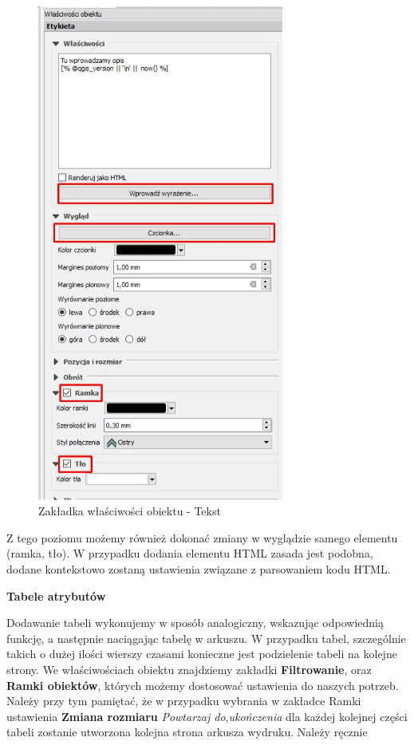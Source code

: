 \documentclass[12pt,a4paper]{book}
\begin{document}
\begin{center}
\begin{figure}
\includegraphics[width=8.096cm,height=16.369cm]{008-zakladka-tekst.png}
\caption{Zakładka właściwości obiektu - Tekst}
\end{figure}
\end{center}
Z tego poziomu możemy również dokonać zmiany w wyglądzie samego elementu (ramka, tło). W przypadku dodania elementu HTML zasada jest podobna, dodane kontekstowo zostaną ustawienia związane z parsowaniem kodu HTML.

{\bfseries
Tabele atrybutów}

Dodawanie tabeli wykonujemy w sposób analogiczny, wskazując odpowiednią funkcję, a następnie {\textquotedbl}naciągając{\textquotedbl} tabelę w arkuszu. W przypadku tabel, szczególnie takich o dużej ilości wierszy czasami konieczne jest podzielenie tabeli na kolejne strony. We właściwościach obiektu znajdziemy zakładki \textbf{Filtrowanie}, oraz \textbf{Ramki obiektów}, których możemy dostosować ustawienia do naszych potrzeb. Należy przy tym pamiętać, że w przypadku wybrania w zakładce Ramki ustawienia \textbf{Zmiana rozmiaru }\textit{Powtarzaj do},\textit{ukończenia} dla każdej kolejnej części tabeli zostanie utworzona kolejna strona arkusza wydruku. Należy ręcznie
\end{document}
